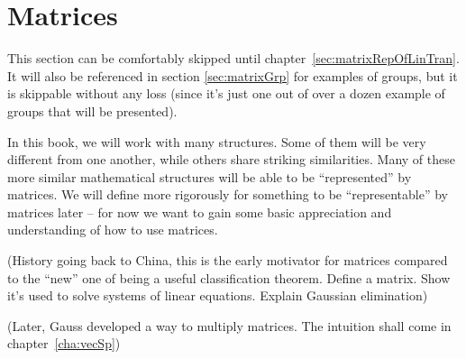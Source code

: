 \documentclass{book}
\newcommand{\R}{{\mathbb{R}}}
\begin{document}

\newpage
\section{Matrices}\label{sec:matrices}

This section can be comfortably skipped until chapter~\ref{sec:matrixRepOfLinTran}. It will also be referenced in
section \ref{sec:matrixGrp} for examples of groups, but it is skippable without any loss (since it's just one out of
over a dozen example of groups that will be presented).

In this book, we will work with many structures. Some of them will be very different from one another, while others
share striking similarities. Many of these more similar mathematical structures will be able to be ``represented'' by
matrices. We will define more rigorously for something to be ``representable'' by matrices later -- for now we want to
gain some basic appreciation and understanding of how to use matrices.

(History going back to China, this is the early motivator for matrices compared to the ``new'' one of being a useful
classification theorem. Define a matrix. Show it's used to solve systems of linear equations. Explain Gaussian
elimination)

(Later, Gauss developed a way to multiply matrices. The intuition shall come in chapter~\ref{cha:vecSp})




\newpage
\printbibliography
\end{document}
